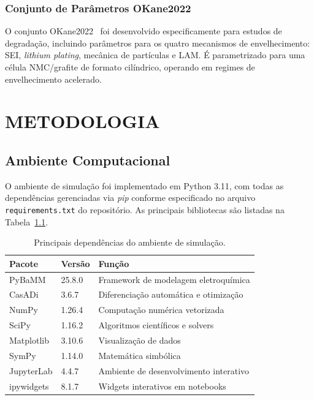 \documentclass[
    12pt,
    openright,
    twoside,
    a4paper,
    brazil,
    english
]{abntex2}
\begin{document}
\subsection{Conjunto de Parâmetros OKane2022}

O conjunto OKane2022~\cite{okane2022lithium} foi desenvolvido especificamente para
estudos de degradação, incluindo parâmetros para os quatro mecanismos de
envelhecimento: SEI, \textit{lithium plating}, mecânica de partículas e LAM.
É parametrizado para uma célula NMC/grafite de formato cilíndrico, operando em
regimes de envelhecimento acelerado.

\chapter{METODOLOGIA}
\label{cap:metodologia}

\section{Ambiente Computacional}

O ambiente de simulação foi implementado em Python 3.11, com todas as dependências
gerenciadas via \textit{pip} conforme especificado no arquivo \texttt{requirements.txt}
do repositório. As principais bibliotecas são listadas na
Tabela~\ref{tab:dependencias}.

\begin{table}[htb]
  \centering
  \caption{Principais dependências do ambiente de simulação.}
  \label{tab:dependencias}
  \begin{tabular}{lll}
    \toprule
    \textbf{Pacote} & \textbf{Versão} & \textbf{Função} \\
    \midrule
    PyBaMM          & 25.8.0  & Framework de modelagem eletroquímica \\
    CasADi          & 3.6.7   & Diferenciação automática e otimização \\
    NumPy           & 1.26.4  & Computação numérica vetorizada \\
    SciPy           & 1.16.2  & Algoritmos científicos e solvers \\
    Matplotlib      & 3.10.6  & Visualização de dados \\
    SymPy           & 1.14.0  & Matemática simbólica \\
    JupyterLab      & 4.4.7   & Ambiente de desenvolvimento interativo \\
    ipywidgets      & 8.1.7   & Widgets interativos em notebooks \\
    \bottomrule
  \end{tabular}
\end{table}
\end{document}
